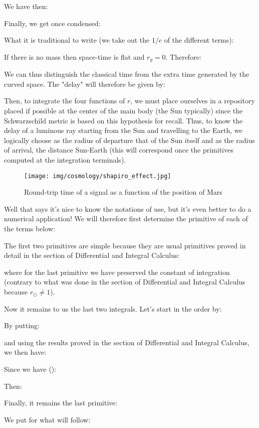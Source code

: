 	We have then:
	
	Finally, we get once condensed:
	
	What it is traditional to write (we take out the $1 / c$ of the different terms):
	
	If there is no mass then space-time is flat and $r_g=0$. Therefore:
	
	We can thus distinguish the classical time from the extra time generated by the curved space. The "delay" will therefore be given by:
	
	Then, to integrate the four functions of $r$, we must place ourselves in a repository placed if possible at the center of the main body (the Sun typically) since the Schwarzschild metric is based on this hypothesis for recall. Thus, to know the delay of a luminous ray starting from the Sun and travelling to the Earth, we logically choose as the radius of departure that of the Sun itself and as the radius of arrival, the distance Sun-Earth (this will correspond once the primitives computed at the integration terminals).
	\begin{figure}[H]
		\centering
		\texttt{[image: img/cosmology/shapiro\_effect.jpg]}	
		\caption{Round-trip time of a signal as a function of the position of Mars}
	\end{figure}
	Well that says it's nice to know the notations of use, but it's even better to do a numerical application! We will therefore first determine the primitive of each of the terms below:
	
	The first two primitives are simple because they are usual primitives proved in detail in the section of Differential and Integral Calculus:
	
	where for the last primitive we have preserved the constant of integration (contrary to what was done in the section of Differential and Integral Calculus because $r_\odot\neq 1$).

	Now it remains to us the last two integrals. Let's start in the order by:
	
	By putting:
	
	and using the results proved in the section of Differential and Integral Calculus, we then have:
	
	Since we have ():
	
	Then:
	
	Finally, it remains the last primitive:
	
	We put for what will follow:
	
